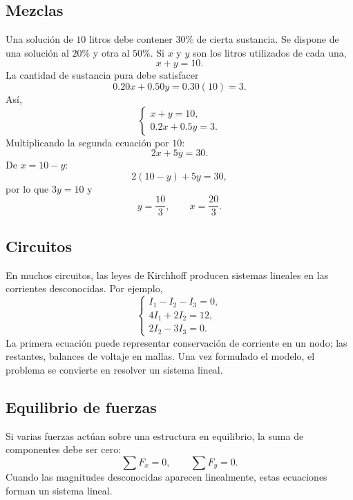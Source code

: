 \documentclass[12pt]{article}
\theoremstyle{remark}
\begin{document}
\subsection*{Mezclas}
Una solución de $10$ litros debe contener $30\%$ de cierta sustancia. Se dispone de una solución al
$20\%$ y otra al $50\%$. Si $x$ y $y$ son los litros utilizados de cada una,
\[
x+y=10.
\]
La cantidad de sustancia pura debe satisfacer
\[
0.20x+0.50y=0.30(10)=3.
\]
Así,
\[
\begin{cases}
x+y=10,\\
0.2x+0.5y=3.
\end{cases}
\]
Multiplicando la segunda ecuación por $10$:
\[
2x+5y=30.
\]
De $x=10-y$:
\[
2(10-y)+5y=30,
\]
por lo que $3y=10$ y
\[
y=\frac{10}{3},\qquad x=\frac{20}{3}.
\]
\subsection*{Circuitos}
En muchos circuitos, las leyes de Kirchhoff producen sistemas lineales en las corrientes desconocidas.
Por ejemplo,
\[
\begin{cases}
I_1-I_2-I_3=0,\\
4I_1+2I_2=12,\\
2I_2-3I_3=0.
\end{cases}
\]
La primera ecuación puede representar conservación de corriente en un nodo; las restantes, balances de
voltaje en mallas. Una vez formulado el modelo, el problema se convierte en resolver un sistema lineal.
\subsection*{Equilibrio de fuerzas}
Si varias fuerzas actúan sobre una estructura en equilibrio, la suma de componentes debe ser cero:
\[
\sum F_x=0,\qquad \sum F_y=0.
\]
Cuando las magnitudes desconocidas aparecen linealmente, estas ecuaciones forman un sistema lineal.
\end{document}
